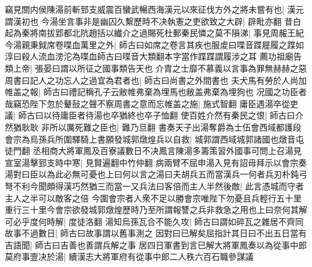 竊見關内侯陳湯前斬郅支威震百蠻武暢西海漢元以來征伐方外之將未嘗有也|{
	漢元謂漢初也}
今湯坐言事非是幽囚久繫歷時不决執憲之吏欲致之大辟|{
	辟毗亦翻}
昔白起為秦將南拔郢都北阬趙括以纎介之過賜死杜郵秦民憐之莫不隕涕|{
	事見周赧王紀}
今湯親秉鉞席卷喋血萬里之外|{
	師古曰如席之卷言其疾也服䖍曰喋音蹀屣履之蹀如淳曰殺人流血滂沱為喋血師古曰喋音大類翻本字當作蹀蹀謂履涉之耳}
薦功祖廟告類上帝|{
	張晏曰謂以所征之國事類告天也}
介胄之士靡不慕義以言事為罪無赫赫之惡周書曰記人之功忘人之過宜為君者也|{
	師古曰尚書之外間書也}
夫犬馬有勞於人尚加帷盖之報|{
	師古曰禮記稱孔子云敝帷弗棄為埋馬也敝盖弗棄為埋狗也}
况國之功臣者哉竊恐陛下忽於鼙鼔之聲不察周書之意而忘帷盖之施|{
	施式智翻}
庸臣遇湯卒從吏議|{
	師古曰以待庸臣者待湯也卒猶終也卒子恤翻}
使百姓介然有秦民之恨|{
	師古曰介然猶耿耿}
非所以厲死難之臣也|{
	難乃旦翻}
書奏天子出湯奪爵為士伍會西域都護段會宗為烏孫兵所圍驛騎上書願發城郭燉煌兵以自救|{
	城郭謂西域城郭諸國也燉音屯徒門翻}
丞相商大將軍鳳及百寮議數日不决鳳言陳湯多籌策習外國事可問上召湯見宣室湯擊郅支時中寒|{
	見賢遍翻中竹仲翻}
病兩臂不屈申湯入見有詔毋拜示以會宗奏湯對曰臣以為此必無可憂也上曰何以言之湯曰夫胡兵五而當漢兵一何者兵刃朴鈍弓弩不利今聞頗得漢巧然猶三而當一又兵法曰客倍而主人半然後敵|{
	此言憑城而守者主人之半可以敵客之倍}
今圍會宗者人衆不足以勝會宗唯陛下勿憂且兵輕行五十里重行三十里今會宗欲發城郭燉煌歷時乃至所謂報讐之兵非救急之用也上曰奈何其解可必乎度何時解|{
	度徒洛翻}
湯知烏孫瓦合不能久攻|{
	師古曰謂如碎瓦之雜居不齊同}
故事不過數日|{
	師古曰故事謂以舊事測之}
因對曰已解矣屈指計其日曰不出五日當有吉語聞|{
	師古曰吉善也善謂兵解之事}
居四日軍書到言已解大將軍鳳奏以為從事中郎莫府事壹决於湯|{
	續漢志大將軍府有從事中郎二人秩六百石職參謀議}



